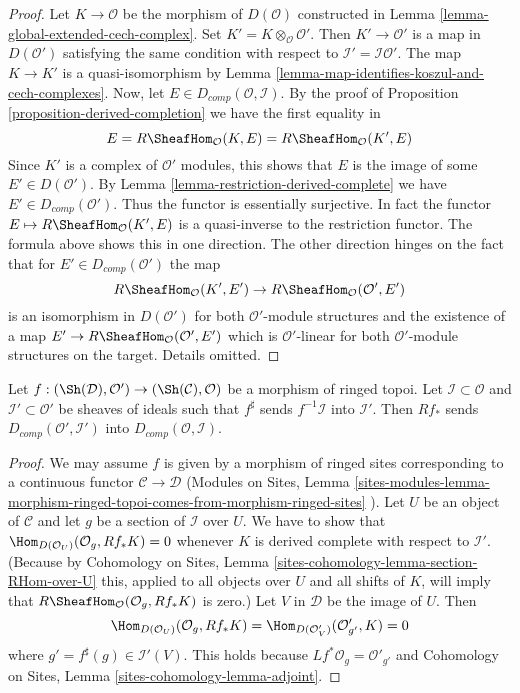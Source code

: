 \begin{proof}
Let $K \to \mathcal{O}$ be the morphism of $D(\mathcal{O})$
constructed in Lemma \ref{lemma-global-extended-cech-complex}. 
Set $K' = K \otimes_\mathcal{O} \mathcal{O}'$. Then $K' \to \mathcal{O}'$
is a map in $D(\mathcal{O}')$ satisfying the same condition
with respect to $\mathcal{I}' = \mathcal{I}\mathcal{O}'$.
The map $K \to K'$ is a quasi-isomorphism by
Lemma \ref{lemma-map-identifies-koszul-and-cech-complexes}.
Now, let $E \in D_{comp}(\mathcal{O}, \mathcal{I})$.
By the proof of Proposition \ref{proposition-derived-completion}
we have the first equality in
$$
E = R\SheafHom_\mathcal{O}(K, E) = R\SheafHom_\mathcal{O}(K', E)
$$
Since $K'$ is a complex of $\mathcal{O}'$ modules, this shows that
$E$ is the image of some $E' \in D(\mathcal{O}')$. By
Lemma \ref{lemma-restriction-derived-complete} we have
$E' \in D_{comp}(\mathcal{O}')$. Thus the functor is essentially
surjective. In fact the functor $E \mapsto R\SheafHom_\mathcal{O}(K', E)$
is a quasi-inverse to the restriction functor. The formula above
shows this in one direction. The other direction hinges on the fact
that for $E' \in D_{comp}(\mathcal{O}')$ the map
$$
R\SheafHom_\mathcal{O}(K', E') \to R\SheafHom_\mathcal{O}(\mathcal{O}', E')
$$
is an isomorphism in $D(\mathcal{O}')$ for both $\mathcal{O}'$-module
structures and the existence of a map
$E' \to R\SheafHom_\mathcal{O}(\mathcal{O}', E')$
which is $\mathcal{O}'$-linear for both $\mathcal{O}'$-module
structures on the target. Details omitted.
\end{proof}

\begin{lemma}
\label{lemma-pushforward-derived-complete}
Let $f : (\Sh(\mathcal{D}), \mathcal{O}') \to (\Sh(\mathcal{C}), \mathcal{O})$
be a morphism of ringed topoi. Let $\mathcal{I} \subset \mathcal{O}$
and $\mathcal{I}' \subset \mathcal{O}'$ be sheaves of ideals such
that $f^\sharp$ sends $f^{-1}\mathcal{I}$ into $\mathcal{I}'$.
Then $Rf_*$ sends $D_{comp}(\mathcal{O}', \mathcal{I}')$
into $D_{comp}(\mathcal{O}, \mathcal{I})$.
\end{lemma}

\begin{proof}
We may assume $f$ is given by a morphism of ringed sites corresponding
to a continuous functor $\mathcal{C} \to \mathcal{D}$
(Modules on Sites, Lemma
\ref{sites-modules-lemma-morphism-ringed-topoi-comes-from-morphism-ringed-sites}
).
Let $U$ be an object of $\mathcal{C}$ and let $g$ be a section of
$\mathcal{I}$ over $U$. We have to show that
$\Hom_{D(\mathcal{O}_U)}(\mathcal{O}_g, Rf_*K) = 0$
whenever $K$ is derived complete with respect to $\mathcal{I}'$.
(Because by Cohomology on Sites, Lemma
\ref{sites-cohomology-lemma-section-RHom-over-U}
this, applied to all objects over $U$ and all shifts of $K$,
will imply that $R\SheafHom_\mathcal{O}(\mathcal{O}_g, Rf_*K)$ is zero.)
Let $V$ in $\mathcal{D}$ be the image of $U$. Then
$$
\Hom_{D(\mathcal{O}_U)}(\mathcal{O}_g, Rf_*K) =
\Hom_{D(\mathcal{O}'_V)}(\mathcal{O}'_{g'}, K) = 0
$$
where $g' = f^\sharp(g) \in \mathcal{I}'(V)$. This holds because
$Lf^*\mathcal{O}_g = \mathcal{O}'_{g'}$ and
Cohomology on Sites, Lemma \ref{sites-cohomology-lemma-adjoint}.
\end{proof}


